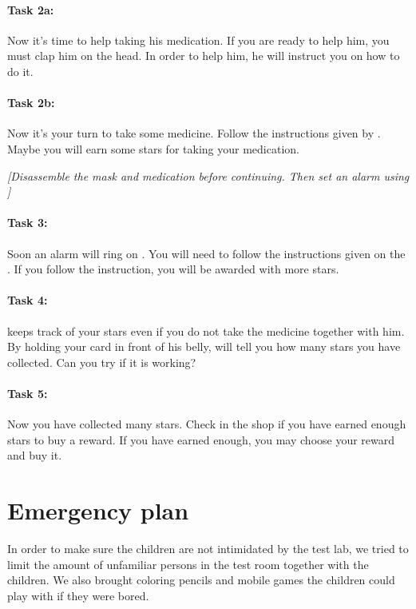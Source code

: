 \paragraph{Task 2a:}

Now it's time to help \ab{} taking his medication. If you are ready to help him, you must clap him on the head. In order to help him, he will instruct you on how to do it. 


\paragraph{Task 2b:}

Now it's your turn to take some medicine. Follow the instructions given by \ab{}. Maybe you will earn some stars for taking your medication.

\emph{[Disassemble the mask and medication before continuing. Then set an alarm using \app{}]}


\paragraph{Task 3:}

Soon an alarm will ring on \app{}. You will need to follow the instructions given on the \app{}. If you follow the instruction, you will be awarded with more stars. 


\paragraph{Task 4:} 
\ab{} keeps track of your stars even if you do not take the medicine together with him. By holding your card in front of his belly, \ab{} will tell you how many stars you have collected. Can you try if it is working?


\paragraph{Task 5:}
Now you have collected many stars. Check in the shop if you have earned enough stars to buy a reward. If you have earned enough, you may choose your reward and buy it. 


\section{Emergency plan}
\label{sec:emergencyplan}
In order to make sure the children are not intimidated by the test lab, we tried to limit the amount of unfamiliar persons in the test room together with the children. We also brought coloring pencils and mobile games the children could play with if they were bored.  

